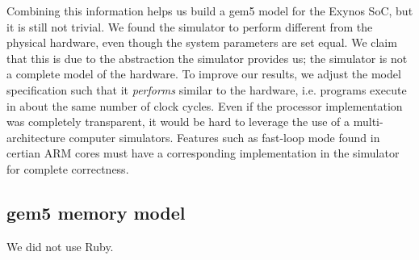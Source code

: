 Combining this information helps us build a gem5 model for the Exynos SoC, but
it is still not trivial. We found the simulator to perform different from the
physical hardware, even though the system parameters are set equal. We claim
that this is due to the abstraction the simulator provides us; the simulator is
not a complete model of the hardware. To improve our results, we adjust the model
specification such that it \textit{performs} similar to the hardware, i.e.
programs execute in about the same number of clock cycles. Even if the processor
implementation was completely transparent, it would be hard to leverage the use
of a multi-architecture computer simulators. Features such as fast-loop mode
found in certian ARM cores must have a corresponding implementation in the
simulator for complete correctness.




\subsection{gem5 memory model}
We did not use Ruby.
